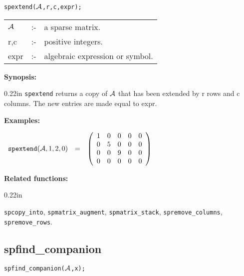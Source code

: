 \hspace*{0.175in} {\tt spextend(${\cal A}$,r,c,expr);}

\hspace*{0.1in} 
\begin{tabular}{l l l}
${\cal A}$ &:-& a sparse matrix. \\
r,c        &:-& positive integers. \\
expr      &:-& algebraic expression or symbol.
\end{tabular}

{\bf Synopsis:} 

\begin{addtolength}{\leftskip}{0.22in}
                {\tt spextend} returns a copy of ${\cal A}$ that has been 
                extended by r rows and c columns. The new entries are
                made equal to expr.

\end{addtolength}

{\bf Examples:}

\begin{flushleft}  
\hspace*{0.1in}
\begin{math}  
\begin{array}{ccc}
{\tt spextend}({\cal A},1,2,0) & = & 
\left( \begin{array}{ccccc} 1 & 0 & 0 & 0 & 0 \\ 0 & 5 & 0 & 0 & 0
\\ 0 & 0 & 9 & 0 & 0 \\ 0 & 0 & 0 & 0 & 0 
\end{array} \right)
\end{array}
\end{math}  
\end{flushleft}

{\bf Related functions:} 

\begin{addtolength}{\leftskip}{0.22in}
\parbox[t]{0.95\linewidth}{{\tt spcopy\_into}, {\tt spmatrix\_augment}, 
{\tt spmatrix\_stack}, {\tt spremove\_columns}, {\tt spremove\_rows}.}

\end{addtolength}


\subsection{spfind\_companion}

\hspace*{0.175in} {\tt spfind\_companion(${\cal A}$,x);}

